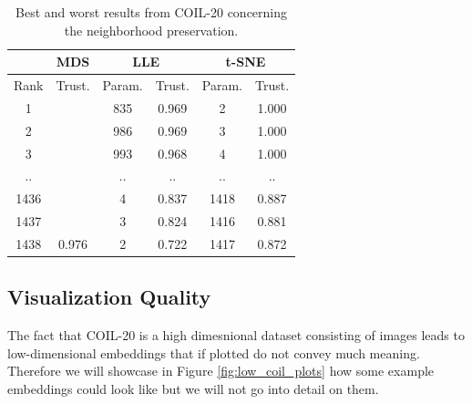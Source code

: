 \begin{table}[]
\centering
\begin{tabular}{|c|cl|cc|cc|}
\hline
 & \multicolumn{2}{c|}{{\color[HTML]{1B9E77} \textbf{MDS}}} & \multicolumn{2}{c|}{{\color[HTML]{D95F02} \textbf{LLE}}} & \multicolumn{2}{c|}{{\color[HTML]{7570B3} \textbf{t-SNE}}} \\ \hline
Rank & \multicolumn{2}{c|}{Trust.} & \multicolumn{1}{c|}{Param.} & Trust. & \multicolumn{1}{c|}{Param.} & Trust. \\ \hline
1 & \multicolumn{2}{c|}{} & \multicolumn{1}{c|}{835} & 0.969 & \multicolumn{1}{c|}{2} & 1.000 \\ \cline{1-1} \cline{4-7} 
2 & \multicolumn{2}{c|}{} & \multicolumn{1}{c|}{986} & 0.969 & \multicolumn{1}{c|}{3} & 1.000 \\ \cline{1-1} \cline{4-7} 
3 & \multicolumn{2}{c|}{} & \multicolumn{1}{c|}{993} & 0.968 & \multicolumn{1}{c|}{4} & 1.000 \\ \cline{1-1} \cline{4-7} 
.. & \multicolumn{2}{c|}{} & \multicolumn{1}{c|}{..} & .. & \multicolumn{1}{c|}{..} & .. \\ \cline{1-1} \cline{4-7} 
1436 & \multicolumn{2}{c|}{} & \multicolumn{1}{c|}{4} & 0.837 & \multicolumn{1}{c|}{1418} & 0.887 \\ \cline{1-1} \cline{4-7} 
1437 & \multicolumn{2}{c|}{} & \multicolumn{1}{c|}{3} & 0.824 & \multicolumn{1}{c|}{1416} & 0.881 \\ \cline{1-1} \cline{4-7} 
1438 & \multicolumn{2}{c|}{\multirow{-7}{*}{0.976}} & \multicolumn{1}{c|}{2} & 0.722 & \multicolumn{1}{c|}{1417} & 0.872 \\ \hline
\end{tabular}
\caption[COIL-20 Neighborhood Preservation]{Best and worst results from COIL-20 concerning the neighborhood preservation.}
\label{tab:best_worst_1nn_coil}
\end{table}

\subsection{Visualization Quality}

The fact that COIL-20 is a high dimesnional dataset consisting of images leads to low-dimensional embeddings that if plotted do not convey much meaning. Therefore we will showcase in Figure \ref{fig:low_coil_plots} how some example embeddings could look like but we will not go into detail on them. 

